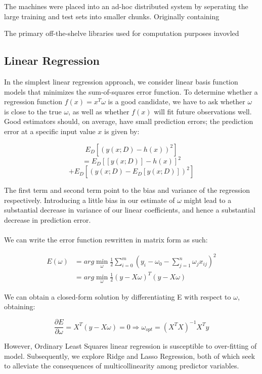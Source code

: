 \documentclass[letterpaper]{article}
\begin{document}
The machines were placed into an ad-hoc distributed system by seperating the large training and test sets into smaller chunks. Originally containing 

The primary off-the-shelve libraries used for computation purposes invovled 

\subsection{Linear Regression}
In the simplest linear regression approach, we consider linear basis function models that minimizes the sum-of-squares error function. To determine whether a regression function $f(x) = x^{T} \omega$ is a good candidate, we have to ask whether $\omega$ is close to the true $\omega$, as well as whether $f(x)$ will fit future observations well. Good estimators should, on average, have small prediction errors; the prediction error at a specific input value $x$ is given by:

\begin{center}
$$ E_D [ (y(x;D) - h(x))^2 ]$$
$$= E_D[ [y(x;D)] - h(x)]^2 $$
$$+ E_D [ (y(x;D)-E_D[y(x;D)])^2 ] $$
\end{center} 

\noindent The first term and second term point to the bias and variance of the regression respectively. Introducing a little bias in our estimate of $\omega$ might lead to a substantial decrease in variance of our linear coefficients, and hence a substantial decrease in prediction error.\\
\\
\noindent We can write the error function rewritten in matrix form as such:

\begin{equation}
\begin{split}
E(\omega) &= arg \min_{\omega} \frac{1}{2} \sum_{i=0}^m \left( y_i - \omega_0 - \sum_{j=1}^{n} \omega_j x_{ij} \right)^2 \\
&= arg \min_{\omega} \frac{1}{2} (y - X\omega)^{T} (y - X\omega)
\end{split}
\end{equation}

\noindent We can obtain a closed-form solution by differentiating E with respect to $\omega$, obtaining:

$$\frac{\partial E}{\partial \omega} = X^{T}(y-X\omega) = 0 \Rightarrow \omega_{opt} = (X^{T}X)^{-1} X^{T}y$$

\noindent However, Ordinary Least Squares linear regression is susceptible to over-fitting of model. Subsequently, we explore Ridge and Lasso Regression, both of which seek to alleviate the consequences of multicollinearity among predictor variables. 
\end{document}

